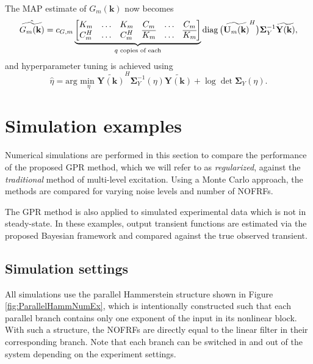 The MAP estimate of $G_m(\mathbf{k})$ now becomes
\begin{equation}
\label{eq:NOFRF_MAP_G_MultRealz}
\hat{\widetilde{G_m(\mathbf{k})}} = c_{G,m} \underbrace{\begin{bmatrix} K_m & \hdots & K_m & C_m & \hdots & C_m \\ C_m^H & \hdots & C_m^H & \overline{K_m} & \hdots & \overline{K_m} \end{bmatrix}}_{q \textrm{ copies of each}} \operatorname{diag} \big( \widetilde{\mathbf{U}_m(\mathbf{k})}^H \big) \mathbf{\Sigma}_Y^{-1} \widetilde{\mathbf{Y}(\mathbf{k})}, 
\end{equation}
and hyperparameter tuning is achieved using
\begin{equation}
\label{eq:NOFRF_HyperparamTuning_MultRealz}
\hat{\eta} = \text{arg } \underset{\eta}{\text{min }} \widetilde{\mathbf{Y}(\mathbf{k})}^H \mathbf{\Sigma}_Y^{-1}(\eta) \widetilde{\mathbf{Y}(\mathbf{k})} + \log \det \mathbf{\Sigma}_Y(\eta).
\end{equation} 


\section{Simulation examples}

Numerical simulations are performed in this section to compare the performance of the proposed GPR method, which we will refer to as \emph{regularized}, against the \emph{traditional} method of multi-level excitation. Using a Monte Carlo approach, the methods are compared for varying noise levels and number of NOFRFs. 

The GPR method is also applied to simulated experimental data which is not in steady-state. In these examples, output transient functions are estimated via the proposed Bayesian framework and compared against the true observed transient.

\subsection{Simulation settings}

All simulations use the parallel Hammerstein structure shown in Figure \ref{fig:ParallelHammNumEx}, which is intentionally constructed such that each parallel branch contains only one exponent of the input in its nonlinear block. With such a structure, the NOFRFs are directly equal to the linear filter in their corresponding branch. Note that each branch can be switched in and out of the system depending on the experiment settings.

